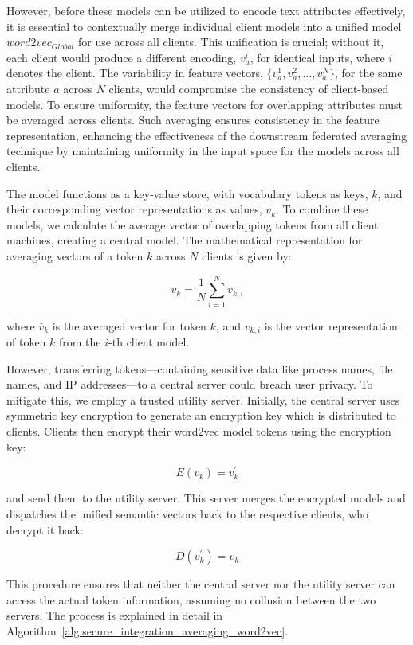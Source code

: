 However, before these models can be utilized to encode text attributes effectively, it is essential to contextually merge individual client \wordvec models into a unified model \( word2vec_{Global} \) for use across all clients. This unification is crucial; without it, each client would produce a different encoding, \(v_a^i\), for identical inputs, where \(i\) denotes the client. The variability in feature vectors, \(\{v_a^1, v_a^2, \ldots, v_a^N\}\), for the same attribute \(a\) across \(N\) clients, would compromise the consistency of client-based \gnnshort models. To ensure uniformity, the feature vectors for overlapping attributes must be averaged across clients. Such averaging ensures consistency in the feature representation, enhancing the effectiveness of the downstream federated averaging technique by maintaining uniformity in the input space for the \gnnshort models across all clients.

The \wordvec model functions as a key-value store, with vocabulary tokens as keys, \(k\), and their corresponding vector representations as values, \(v_k\). To combine these models, we calculate the average vector of overlapping tokens from all client machines, creating a central model. The mathematical representation for averaging vectors of a token \(k\) across \(N\) clients is given by:

\[
\bar{v}_k = \frac{1}{N} \sum_{i=1}^{N} v_{k,i}
\]

where \(\bar{v}_k\) is the averaged vector for token \(k\), and \(v_{k,i}\) is the vector representation of token \(k\) from the \(i\)-th client model.

However, transferring tokens—containing sensitive data like process names, file names, and IP addresses—to a central server could breach user privacy. To mitigate this, we employ a trusted utility server. Initially, the central server uses symmetric key encryption to generate an encryption key which is distributed to clients. Clients then encrypt their word2vec model tokens using the encryption key:

\[
E(v_{k}) = v_{k}^{'}
\]

and send them to the utility server. This server merges the encrypted models and dispatches the unified semantic vectors back to the respective clients, who decrypt it back:

\[
D(v_{k}^{'}) = v_{k}
\]

This procedure ensures that neither the central server nor the utility server can access the actual token information, assuming no collusion between the two servers. The process is explained in detail in Algorithm~\ref{alg:secure_integration_averaging_word2vec}.

